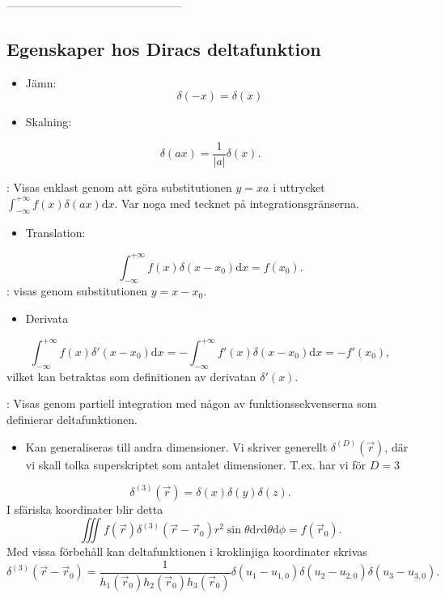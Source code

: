 \documentclass[%
oneside,                 %
final,                   %
10pt]{article}
\newcommand{\shortinlinecomment}[3]{{\color{red}{\bf #1}: #2}}
\newcommand{\longinlinecomment}[3]{{\color{red}{\bf #1}: #2}}
\begin{document}
-----------------------------------------------

\subsection{Egenskaper hos Diracs deltafunktion}

\begin{itemize}
\item Jämn: $$\delta(-x) = \delta(x)$$

\item Skalning: 
\end{itemize}

\noindent
$$
\delta(ax) = \frac{1}{|a|} \delta(x).
$$ 

\longinlinecomment{Comment 1}{ Visas enklast genom att göra substitutionen $y=x a$ i uttrycket $\int_{-\infty}^{+\infty} f(x) \delta(ax) \mbox{d}x$. Var noga med tecknet på integrationsgränserna. }{ Visas enklast genom att }
\begin{itemize}
\item Translation: 
\end{itemize}

\noindent
$$
\int_{-\infty}^{+\infty} f(x) \delta(x-x_0) \mbox{d}x = f(x_0).
$$
\shortinlinecomment{Comment 2}{ visas genom substitutionen $y=x-x_0$. }{ visas genom substitutionen $y=x-x_0$. }
\begin{itemize}
\item Derivata 
\end{itemize}

\noindent
$$
\int_{-\infty}^{+\infty} f(x) \delta'(x-x_0) \mbox{d}x = -\int_{-\infty}^{+\infty} f'(x) \delta(x-x_0) \mbox{d}x = -f'(x_0),
$$
vilket kan betraktas som definitionen av derivatan $\delta'(x)$.

\shortinlinecomment{Comment 3}{ Visas genom partiell integration med någon av funktionssekvenserna som definierar deltafunktionen. }{ Visas genom partiell integration }
\begin{itemize}
\item Kan generaliseras till andra dimensioner. Vi skriver generellt $\delta^{(D)}(\vec{r})$, där vi skall tolka superskriptet som antalet dimensioner. T.ex. har vi för $D=3$ 
\end{itemize}

\noindent
$$
\delta^{(3)}(\vec{r}) = \delta(x) \delta(y) \delta(z).
$$
I sfäriska koordinater blir detta
$$
\iiint f(\vec{r}) \delta^{(3)}(\vec{r} - \vec{r}_0) r^2 \sin\theta \mbox{d}r \mbox{d}\theta \mbox{d}\phi = f(\vec{r}_0).
$$
Med vissa förbehåll kan deltafunktionen i kroklinjiga koordinater skrivas
$$
\delta^{(3)}(\vec{r} - \vec{r}_0) = \frac{1}{h_1(\vec{r}_0) h_2(\vec{r}_0) h_3(\vec{r}_0)} \delta(u_1-u_{1,0}) \delta(u_2-u_{2,0}) \delta(u_3-u_{3,0}).
$$
\end{document}
